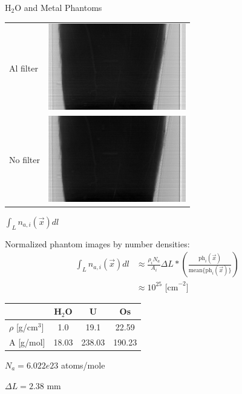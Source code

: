 \documentclass[presentation]{beamer}
\begin{document}
\begin{frame}{H$_2$O and Metal Phantoms}
  \begin{center}
    \begin{tabular}{m{5em} m{8cm}}
      Al filter & \includegraphics[width=6cm]{figs/Al_1080}\\
      No filter & \includegraphics[width=6cm]{figs/No_1080}
    \end{tabular}
  \end{center}
\end{frame}


\begin{frame}{$\int_L n_{a,i}(\vec{x}) dl$}

  Normalized phantom images by number densities:
  \begin{align}
    \int_L n_{a,i}(\vec{x}) dl &\approx \frac{\rho_i N_a}{A_i} \Delta L * \left(\frac{\text{ph}_i(\vec{x})}{\text{mean}\{\text{ph}_i(\vec{x})\}}\right)\\
                               &\approx 10^{25} \text{ [cm}^{-2}]
  \end{align}

  \begin{table}
    \centering
    \begin{tabular}{l |c c c}
      & H$_2$O & U & Os\\\hline
      $\rho$ [g/cm$^{3}$] & 1.0 & 19.1 & 22.59\\
      A [g/mol] & 18.03 & 238.03 & 190.23\\
    \end{tabular}      
  \end{table}

  \centering
  $N_a = 6.022e23$ atoms/mole

  $\Delta L = 2.38$ mm

  

\end{frame}
\end{document}
